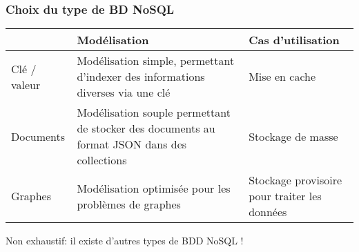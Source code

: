 		\begin{frame}
			\frametitle{Choix du type de BD NoSQL}

			\begin{tabular}{|p{}|p{}|p{}|}
				\hline
				& Modélisation & Cas d'utilisation \\\hline
				Clé / valeur
				& Modélisation simple, permettant d'indexer des informations diverses via une clé
				& Mise en cache  \\\hline
				Documents
				& Modélisation souple permettant de stocker des documents au format JSON dans des collections
				& Stockage de masse \\\hline
				Graphes
				& Modélisation optimisée pour les problèmes de graphes
				& Stockage provisoire pour traiter les données \\\hline
			\end{tabular}
			\vspace{2px}
			Non exhaustif: il existe d'autres types de BDD NoSQL !
		\end{frame}
